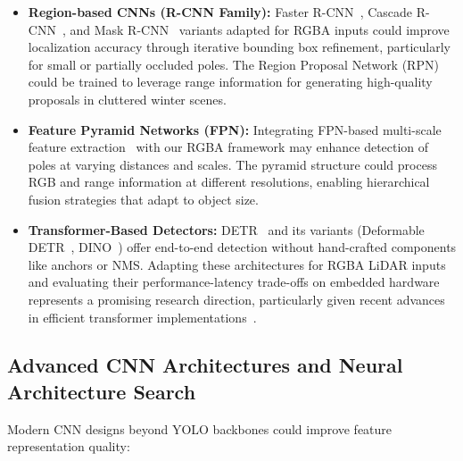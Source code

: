 \documentclass[runningheads]{llncs}
\begin{document}
\begin{itemize}
    \item \textbf{Region-based CNNs (R-CNN Family):} Faster R-CNN~\cite{ren2015faster}, Cascade R-CNN~\cite{cai2018cascade}, and Mask R-CNN~\cite{he2017mask} variants adapted for RGBA inputs could improve localization accuracy through iterative bounding box refinement, particularly for small or partially occluded poles. The Region Proposal Network (RPN) could be trained to leverage range information for generating high-quality proposals in cluttered winter scenes.
    
    \item \textbf{Feature Pyramid Networks (FPN):} Integrating FPN-based multi-scale feature extraction~\cite{lin2017feature} with our RGBA framework may enhance detection of poles at varying distances and scales. The pyramid structure could process RGB and range information at different resolutions, enabling hierarchical fusion strategies that adapt to object size.
    
    \item \textbf{Transformer-Based Detectors:} DETR~\cite{carion2020end} and its variants (Deformable DETR~\cite{zhu2020deformable}, DINO~\cite{zhang2022dino}) offer end-to-end detection without hand-crafted components like anchors or NMS. Adapting these architectures for RGBA LiDAR inputs and evaluating their performance-latency trade-offs on embedded hardware represents a promising research direction, particularly given recent advances in efficient transformer implementations~\cite{dosovitskiy2020image}.
\end{itemize}

\subsection{Advanced CNN Architectures and Neural Architecture Search}

Modern CNN designs beyond YOLO backbones could improve feature representation quality:
\end{document}
